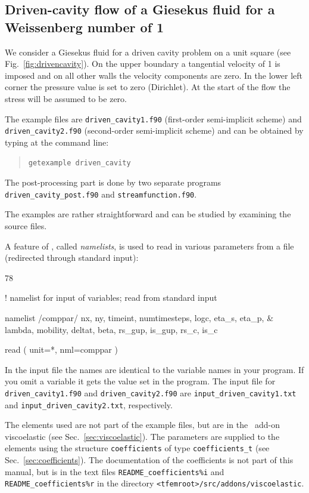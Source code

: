 \subsection{Driven-cavity flow of a Giesekus fluid for a Weissenberg number of
1}
\label{sec:driven_cavity}

We consider a Giesekus fluid for a driven cavity problem on a unit square
(see Fig.~\ref{fig:drivencavity}). On the upper boundary a tangential
velocity of 1 is imposed and on all other walls the velocity components are
zero. In the lower left corner the pressure value is set to zero (Dirichlet).
At the start of the flow the stress will be assumed to be zero.

The example files are \texttt{driven\_cavity1.f90} (first-order semi-implicit
scheme) and \newline
\texttt{driven\_cavity2.f90}  (second-order semi-implicit
scheme) and can be obtained by typing at the
command line:
\medskip
\begin{quote}
   \texttt{getexample driven\_cavity}
\end{quote}
The post-processing part is done by two separate programs
\texttt{driven\_cavity\_post.f90} and \texttt{streamfunction.f90}.

The examples are rather straightforward and can be studied by examining the
source files.

A feature of \ftn, called \emph{namelists},
is used to read in various parameters from a file (redirected through standard
input):

\begin{listing}{78}

! namelist for input of variables; read from standard input

  namelist /comppar/ nx, ny, timeint, numtimesteps, logc, eta_s, eta_p, &
    lambda, mobility, deltat, beta, rs_gup, is_gup, rs_c, is_c

  read ( unit=*, nml=comppar )

\end{listing}
In the input file the names are identical to the variable names in your
program. If you omit a variable it gets the value set in the program. The input
file for \texttt{driven\_cavity1.f90} and \texttt{driven\_cavity2.f90} are
\texttt{input\_driven\_cavity1.txt} and \texttt{input\_driven\_cavity2.txt}, respectively.

The elements used are not part of the example files, but are in the
\tfem\ add-on viscoelastic (see Sec.~\ref{sec:viscoelastic}). The parameters are
supplied to the elements using the structure \texttt{coefficients} of type
\texttt{coefficients\_t} (see Sec.~\ref{sec:coefficients}). The documentation
of the coefficients is not part of this manual, but is in the text files
\texttt{README\_coefficients\%i} and
\texttt{README\_coefficients\%r} in the directory
\texttt{<tfemroot>/src/addons/viscoelastic}.

